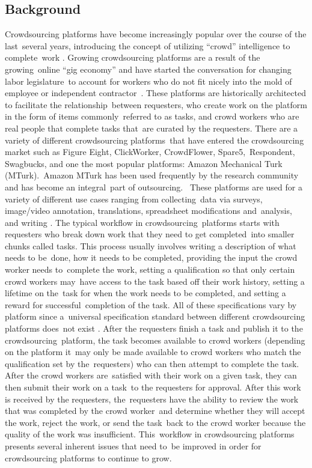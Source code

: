 \documentclass[letterpaper,12pt]{article}
\begin{document}
\subsection{Background}
Crowdsourcing platforms have become increasingly popular over the course of the last\ 
several years, introducing the concept of utilizing ``crowd'' intelligence to complete\
work \cite{kuek2015global}. Growing crowdsourcing platforms are a result of the growing\
online ``gig economy'' and have started the conversation for changing labor legislature\
to account for workers who do not fit nicely into the mold of employee or independent contractor\
\cite{harris2015proposal}.
These platforms are historically architected to facilitate the relationship\ 
between requesters, who create work on the platform in the form of items commonly\ 
referred to as tasks, and crowd workers who are real people that complete tasks that\ 
are curated by the requesters. There are a variety of different crowdsourcing platforms\ 
that have entered the crowdsourcing market such as Figure Eight, ClickWorker, CrowdFlower, Spare5,\ 
Respondent, Swagbucks, and one the most popular platforms: Amazon Mechanical Turk (MTurk).\ 
Amazon MTurk has been used frequently by the research community and has become an integral\
part of outsourcing. \cite{hitlin2016research}\ 
These platforms are used for a variety of different use cases ranging from collecting\
data via surveys, image/video annotation, translations, spreadsheet modifications and\ 
analysis, and writing \cite{ipeirotis2010Analysis}. The typical workflow in crowdsourcing\ 
platforms starts with requesters who break down work that they need to get completed\ 
into smaller chunks called tasks. This process usually involves writing a description of what needs to be\ 
done, how it needs to be completed, providing the input the crowd worker needs to\ 
complete the work, setting a qualification so that only certain crowd workers may\ 
have access to the task based off their work history, setting a lifetime on the\ 
task for when the work needs to be completed, and setting a reward for successful\ 
completion of the task. All of these specifications vary by platform since a\ 
universal specification standard between different crowdsourcing platforms does\ 
not exist \cite{allahbakhsh2013quality}. After the requesters finish a task and publish it to the crowdsourcing\ 
platform, the task becomes available to crowd workers (depending on the platform it\ 
may only be made available to crowd workers who match the qualification set by the\ 
requesters) who can then attempt to complete the task. After the crowd workers are\ 
satisfied with their work on a given task, they can then submit their work on a task\ 
to the requesters for approval. After this work is received by the requesters, the\ 
requesters have the ability to review the work that was completed by the crowd worker\
and determine whether they will accept the work, reject the work, or send the task\ 
back to the crowd worker because the quality of the work was insufficient. This\ 
workflow in crowdsourcing platforms presents several inherent issues that need to\ 
be improved in order for crowdsourcing platforms to continue to grow.
\end{document}
